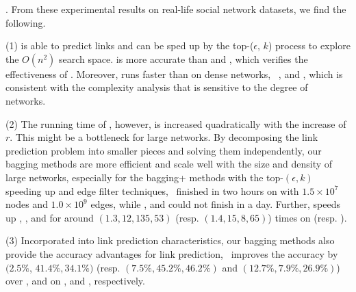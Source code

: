 . From these experimental results on real-life social network datasets,
we find the following.

\sstab (1) \NMF is able to predict links and can be sped up
by the top-($\epsilon$, $k$) process to explore the $O(n^2)$ search space. \NMF is
more accurate than \Aa and \BIGCLAM, which verifies the effectiveness
of \NMF. Moreover, \NMF runs faster than \BIGCLAM on dense networks,
\eg~\Wikipedia, \Twitter and \Friendster, which is consistent with the complexity analysis
that \BIGCLAM is sensitive to the degree of networks.

\sstab (2) The running time of
\NMF, however, is increased quadratically with the increase of $r$. This might be a bottleneck
for large networks. By decomposing the link prediction problem into smaller pieces
and solving them independently, our bagging methods are more efficient and
scale well with the size and density of large networks, especially for the bagging+
methods with the top-$(\epsilon, k)$ speeding up and edge filter techniques,
\eg\ \Biasedp finished in two hours on \Friendster with $1.5\times 10^7$ nodes and
$1.0\times 10^9$ edges, while \NMF, \Aa  and \BIGCLAM could not finish in a day.
Further, \Biasedp speeds up \Biased, \NMF, \Aa and \BIGCLAM
for around $(1.3, 12, 135, 53)$ (resp. $(1.4, 15, 8, 65)$) times on \Twitter (resp. \Friendster).

\sstab (3) Incorporated into link prediction characteristics, our
bagging methods also provide the accuracy advantages for link prediction,
\eg~\Biased improves the accuracy by $(2.5\%$, $41.4\%, 34.1\%)$ (resp. $(7.5\%, 45.2\%, 46.2\%)$ and $(12.7\%, 7.9\%, 26.9\%)$)
over \NMF, \Aa and \BIGCLAM on \Digg, \YouTube and \Wikipedia, respectively.













%
%
%
%
%
%


